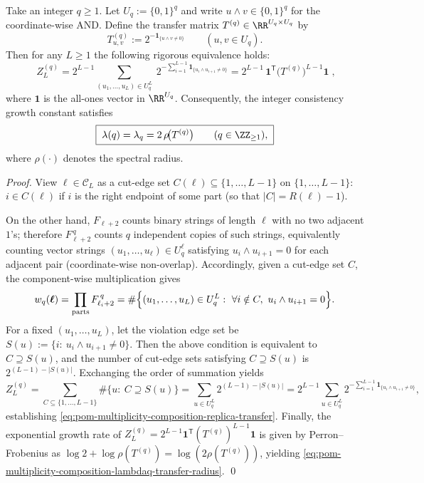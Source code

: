 \begin{proposition}\label{prop:pom-multiplicity-composition-replica-softcore-transfer}
Take an integer \(q\ge 1\).
Let \(U_q:=\{0,1\}^q\) and write \(u\wedge v\in\{0,1\}^q\) for the coordinate-wise AND.
Define the transfer matrix \(T^{(q)}\in\RR^{U_q\times U_q}\) by
\[
T^{(q)}_{u,v}:=2^{-\mathbf{1}_{\{u\wedge v\neq 0\}}}
\qquad(u,v\in U_q).
\]
Then for any \(L\ge 1\) the following rigorous equivalence holds:
\begin{equation}\label{eq:pom-multiplicity-composition-replica-transfer}
\boxed{\;
Z_L^{(q)}=2^{L-1}\sum_{(u_1,\dots,u_L)\in U_q^{L}}\ 2^{-\sum_{i=1}^{L-1}\mathbf{1}_{\{u_i\wedge u_{i+1}\neq 0\}}}
=2^{L-1}\,\mathbf{1}^{\mathsf T}\bigl(T^{(q)}\bigr)^{L-1}\mathbf{1}\; } ,
\end{equation}
where \(\mathbf{1}\) is the all-ones vector in \(\RR^{U_q}\).
Consequently, the integer consistency growth constant satisfies
\begin{equation}\label{eq:pom-multiplicity-composition-lambdaq-transfer-radius}
\boxed{\;
\lambda(q)=\lambda_q=2\,\rho\!\bigl(T^{(q)}\bigr)\qquad(q\in\ZZ_{\ge 1}),\;}
\end{equation}
where \(\rho(\cdot)\) denotes the spectral radius.
\end{proposition}
\begin{proof}
View \(\boldsymbol{\ell}\in\mathcal{C}_L\) as a cut-edge set \(C(\boldsymbol{\ell})\subseteq\{1,\dots,L-1\}\) on \(\{1,\dots,L-1\}\):
\(i\in C(\boldsymbol{\ell})\) if \(i\) is the right endpoint of some part (so that \(|C|=R(\boldsymbol{\ell})-1\)).
\par
On the other hand, \(F_{\ell+2}\) counts binary strings of length \(\ell\) with no two adjacent \(1\)'s;
therefore \(F_{\ell+2}^{\,q}\) counts \(q\) independent copies of such strings, equivalently counting vector strings \((u_1,\dots,u_\ell)\in U_q^\ell\) satisfying \(u_i\wedge u_{i+1}=0\) for each adjacent pair (coordinate-wise non-overlap).
Accordingly, given a cut-edge set \(C\), the component-wise multiplication gives
\[
w_q(\boldsymbol{\ell})
=\prod_{\text{parts}}F_{\ell_i+2}^{\,q}
=\#\Bigl\{(u_1,\dots,u_L)\in U_q^L:\ \forall i\notin C,\ u_i\wedge u_{i+1}=0\Bigr\}.
\]
For a fixed \((u_1,\dots,u_L)\), let the violation edge set be
\(
S(u):=\{i:\ u_i\wedge u_{i+1}\neq 0\}
\).
Then the above condition is equivalent to \(C\supseteq S(u)\), and the number of cut-edge sets satisfying \(C\supseteq S(u)\) is \(2^{(L-1)-|S(u)|}\).
Exchanging the order of summation yields
\[
Z_L^{(q)}
=\sum_{C\subseteq\{1,\dots,L-1\}}\#\{u:\ C\supseteq S(u)\}
=\sum_{u\in U_q^L}2^{(L-1)-|S(u)|}
=2^{L-1}\sum_{u\in U_q^L}2^{-\sum_{i=1}^{L-1}\mathbf{1}_{\{u_i\wedge u_{i+1}\neq 0\}}},
\]
establishing \eqref{eq:pom-multiplicity-composition-replica-transfer}.
Finally, the exponential growth rate of \(Z_L^{(q)}=2^{L-1}\mathbf{1}^{\mathsf T}(T^{(q)})^{L-1}\mathbf{1}\) is given by Perron--Frobenius as
\(
\log 2+\log\rho(T^{(q)})=\log(2\rho(T^{(q)}))
\), yielding \eqref{eq:pom-multiplicity-composition-lambdaq-transfer-radius}. \qed
\end{proof}

